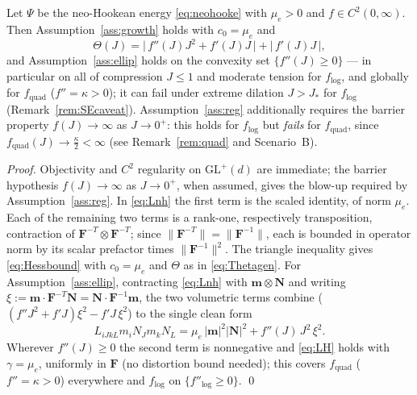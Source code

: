 \begin{lemma}
    \label{lem:nh}
    Let $\Psi$ be the neo-Hookean energy \eqref{eq:neohooke} with $\mu_e>0$ and $f\in C^2(0,\infty)$. Then
    Assumption~\ref{ass:growth} holds with $c_0=\mu_e$ and
    \begin{equation}
        \label{eq:Thetagen}
        \Theta(J) = \big|\,f''(J)J^2 + f'(J)J\,\big| + \big|\,f'(J)J\,\big|,
    \end{equation}
    and Assumption~\ref{ass:ellip} holds on the convexity set $\{f''(J)\ge0\}$ --- in particular on all of compression
    $J\le1$ and moderate tension for $f_{\log}$, and globally for $f_{\mathrm{quad}}$ ($f''=\kappa>0$); it can fail under
    extreme dilation $J>J_*$ for $f_{\log}$ (Remark~\ref{rem:SEcaveat}). Assumption~\ref{ass:reg}
    additionally requires the barrier property $f(J)\to\infty$ as $J\to0^+$: this holds for $f_{\log}$ but \emph{fails}
    for $f_{\mathrm{quad}}$, since $f_{\mathrm{quad}}(J)\to\tfrac{\kappa}{2}<\infty$ (see Remark~\ref{rem:quad} and
    Scenario~B).
\end{lemma}

\begin{proof}
    Objectivity and $C^2$ regularity on $\mathrm{GL}^+(d)$ are immediate; the barrier hypothesis $f(J)\to\infty$ as
    $J\to0^+$, when assumed, gives the blow-up required by Assumption~\ref{ass:reg}. In \eqref{eq:Lnh} the first term is
    the scaled identity, of norm $\mu_e$. Each
    of the remaining two terms is a rank-one, respectively transposition, contraction of $\bm{F}^{-T}\otimes\bm{F}^{-T}$;
    since $\|\bm{F}^{-T}\|=\|\bm{F}^{-1}\|$, each is bounded in operator norm by its scalar prefactor times
    $\|\bm{F}^{-1}\|^2$. The triangle inequality gives \eqref{eq:Hessbound} with $c_0=\mu_e$ and $\Theta$ as in
    \eqref{eq:Thetagen}. For Assumption~\ref{ass:ellip}, contracting \eqref{eq:Lnh} with $\bm{m}\otimes\bm{N}$ and
    writing $\xi:=\bm{m}\cdot\bm{F}^{-T}\bm{N}=\bm{N}\cdot\bm{F}^{-1}\bm{m}$, the two volumetric terms combine
    ($(f''J^2+f'J)\xi^2-f'J\,\xi^2$) to the single clean form
    \begin{equation}
        \label{eq:LHnh}
        L_{iJkL}m_iN_Jm_kN_L = \mu_e\,|\bm{m}|^2|\bm{N}|^2 + f''(J)\,J^2\,\xi^2 .
    \end{equation}
    Wherever $f''(J)\ge0$ the second term is nonnegative and \eqref{eq:LH} holds with $\gamma=\mu_e$, uniformly in
    $\bm{F}$ (no distortion bound needed); this covers $f_{\mathrm{quad}}$ ($f''=\kappa>0$) everywhere and $f_{\log}$ on
    $\{f''_{\log}\ge0\}$. \qed
\end{proof}


